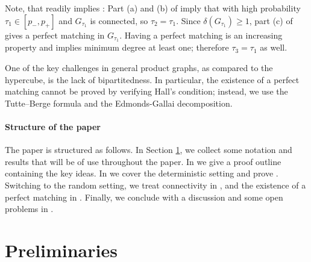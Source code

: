 \documentclass[10pt,a4paper]{article}
\begin{document}
Note, that  readily implies : Part (a) and (b) of  imply that with high probability $\tau_1\in[p_-,p_+]$ and $G_{\tau_1}$ is connected, so $\tau_2=\tau_1$.
Since $\delta(G_{\tau_1})\ge1$, part (c) of  gives a perfect matching in $G_{\tau_1}$.
Having a perfect matching is an increasing property and implies minimum degree at least one; therefore $\tau_3=\tau_1$ as well.

One of the key challenges in general product graphs, as compared to the hypercube, is the lack of bipartitedness. In particular, the existence of a perfect matching cannot be proved by verifying Hall's condition; instead, we use the Tutte--Berge formula and the Edmonds-Gallai decomposition. %

\paragraph{Structure of the paper}

The paper is structured as follows. In Section \ref{s:prelim}, we collect some notation and results that will be of use throughout the paper. In  we give a proof outline containing the key ideas. In  we cover the deterministic setting and prove . Switching to the random setting, we treat connectivity in , and the existence of a perfect matching in . Finally, we conclude with a discussion and some open problems in .

\section{Preliminaries}\label{s:prelim}
\end{document}
